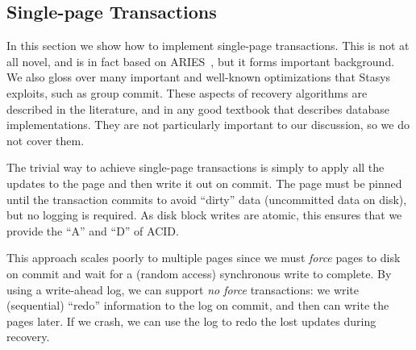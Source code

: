 \documentclass[letterpaper,twocolumn,10pt]{article}
\newcommand{\yad}{Stasys\xspace}
\newcommand{\eat}[1]{}
\begin{document}
\eat{
\yad uses write-ahead-logging to support the
four properties of transactional storage: Atomicity, Consistency,
Isolation and Durability.  Like existing transactional storage systems,
\yad allows applications to disable or choose different variants of each
property.

However, \yad takes customization of transactional semantics one step
further, allowing applications to add support for transactional
semantics that we have not anticipated.  We do not believe that
we can anticipate every possible variation of write-ahead-logging.  
However, we
have observed that most changes that we are interested in making
involve a few common underlying primitives.  

As we have
implemented new extensions, we have located portions of the system
that are prone to change, and have extended the API accordingly.  Our
goal is to allow applications to implement their own modules to
replace our implementations of each of the major write-ahead-logging
components.
}


\subsection{Single-page Transactions}

In this section we show how to implement single-page transactions.
This is not at all novel, and is in fact based on ARIES~\cite{aries},
but it forms important background.  We also gloss over many important
and well-known optimizations that \yad exploits, such as group
commit.%
These aspects of recovery algorithms are
described in the literature, and in any good textbook that describes
database implementations.  They are not particularly important to our
discussion, so we do not cover them.

The trivial way to achieve single-page transactions is simply to apply
all the updates to the page and then write it out on commit. The page
must be pinned until the transaction commits to avoid ``dirty'' data
(uncommitted data on disk), but no logging is required.  As disk
block writes are atomic, this ensures that we provide the ``A'' and ``D''
of ACID.

This approach scales poorly to multiple pages since we must {\em force} pages to disk
on commit and wait for a (random access) synchronous write to
complete. By using a write-ahead log, we can support {\em no force}
transactions: we write (sequential) ``redo'' information to the log on commit, and
then can write the  pages later. If we crash, we can use the log to
redo the lost updates during recovery.
\end{document}
